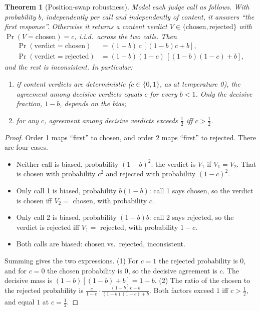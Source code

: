 \documentclass[conference]{IEEEtran}
\newtheorem{theorem}{Theorem}
\theoremstyle{remark}
\begin{document}
\begin{theorem}[Position-swap robustness]\label{thm:swap}
Model each judge call as follows. With probability $b$, independently per call and independently of content, it answers ``the first response''. Otherwise it returns a content verdict $V\in\{\text{chosen},\text{rejected}\}$ with $\Pr(V=\text{chosen})=c$, i.i.d.\ across the two calls. Then
\begin{align}
\Pr(\text{verdict}=\text{chosen})&=(1-b)\,c\,[(1-b)c+b],\\
\Pr(\text{verdict}=\text{rejected})&=(1-b)(1-c)\,[(1-b)(1-c)+b],
\end{align}
and the rest is inconsistent. In particular:
\begin{enumerate}
\item if content verdicts are deterministic ($c\in\{0,1\}$, as at temperature 0), the agreement among decisive verdicts equals $c$ for every $b<1$. Only the decisive fraction, $1-b$, depends on the bias;
\item for any $c$, agreement among decisive verdicts exceeds $\tfrac12$ iff $c>\tfrac12$.
\end{enumerate}
\end{theorem}
\begin{proof}
Order 1 maps ``first'' to chosen, and order 2 maps ``first'' to rejected. There are four cases.
\begin{itemize}
\item Neither call is biased, probability $(1-b)^2$: the verdict is $V_1$ if $V_1=V_2$. That is chosen with probability $c^2$ and rejected with probability $(1-c)^2$.
\item Only call 1 is biased, probability $b(1-b)$: call 1 says chosen, so the verdict is chosen iff $V_2=$ chosen, with probability $c$.
\item Only call 2 is biased, probability $(1-b)b$: call 2 says rejected, so the verdict is rejected iff $V_1=$ rejected, with probability $1-c$.
\item Both calls are biased: chosen vs.\ rejected, inconsistent.
\end{itemize}
Summing gives the two expressions. (1) For $c=1$ the rejected probability is $0$, and for $c=0$ the chosen probability is $0$, so the decisive agreement is $c$. The decisive mass is $(1-b)[(1-b)+b]=1-b$. (2) The ratio of the chosen to the rejected probability is $\frac{c}{1-c}\cdot\frac{(1-b)c+b}{(1-b)(1-c)+b}$. Both factors exceed $1$ iff $c>\tfrac12$, and equal $1$ at $c=\tfrac12$.
\end{proof}
\end{document}
